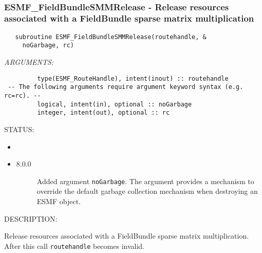 
\mbox{}\hrulefill\ 
 
\subsubsection [ESMF\_FieldBundleSMMRelease] {ESMF\_FieldBundleSMMRelease - Release resources associated with a FieldBundle sparse matrix multiplication}


  
\begin{verbatim}   subroutine ESMF_FieldBundleSMMRelease(routehandle, &
     noGarbage, rc)\end{verbatim}{\em ARGUMENTS:}
\begin{verbatim}         type(ESMF_RouteHandle), intent(inout) :: routehandle
 -- The following arguments require argument keyword syntax (e.g. rc=rc). --
         logical, intent(in), optional :: noGarbage
         integer, intent(out), optional :: rc\end{verbatim}
{\sf STATUS:}
   \begin{itemize}
   \item{}
   \item{}
   \begin{description}
   \item[8.0.0] Added argument {\tt noGarbage}.
   The argument provides a mechanism to override the default garbage collection
   mechanism when destroying an ESMF object.
   \end{description}
   \end{itemize}
  
{\sf DESCRIPTION:\\ }


   Release resources associated with a FieldBundle sparse matrix multiplication. After this call
   {\tt routehandle} becomes invalid.
  
